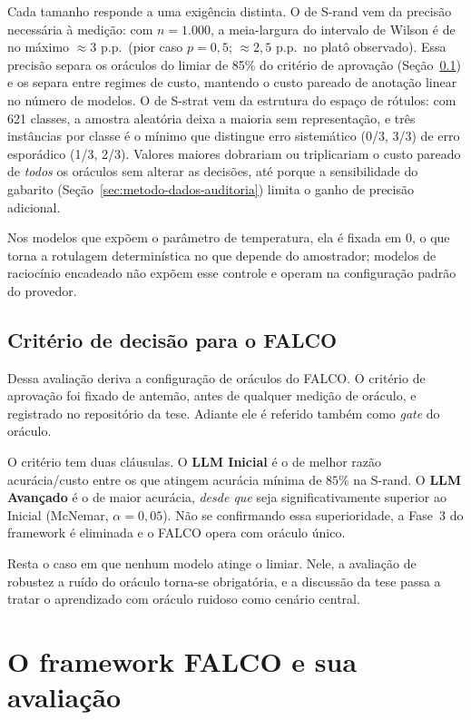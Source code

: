 Cada tamanho responde a uma exigência distinta. O de S-rand vem da precisão
necessária à medição: com $n=1.000$, a meia-largura do intervalo de Wilson é de
no máximo $\approx 3$ p.p.\ (pior caso $p=0{,}5$; $\approx 2{,}5$ p.p.\ no
platô observado). Essa precisão separa os oráculos do limiar de 85\% do
critério de aprovação (Seção~\ref{sec:metodo-oraculo-decisao}) e os separa
entre regimes de custo, mantendo o custo pareado de anotação linear no número
de modelos. O de S-strat vem da estrutura do espaço de rótulos: com 621
classes, a amostra aleatória deixa a maioria sem representação, e três
instâncias por classe é o mínimo que distingue erro sistemático (0/3, 3/3) de
erro esporádico (1/3, 2/3). Valores maiores dobrariam ou triplicariam o custo
pareado de \emph{todos} os oráculos sem alterar as decisões, até porque a
sensibilidade do gabarito (Seção~\ref{sec:metodo-dados-auditoria}) limita o
ganho de precisão adicional.

Nos modelos que expõem o parâmetro de temperatura, ela é fixada em 0, o que
torna a rotulagem determinística no que depende do amostrador; modelos de
raciocínio encadeado não expõem esse controle e operam na configuração padrão
do provedor.

\subsection{Critério de decisão para o FALCO}
\label{sec:metodo-oraculo-decisao}

Dessa avaliação deriva a configuração de oráculos do FALCO. O critério de
aprovação foi fixado de antemão, antes de qualquer medição de oráculo, e
registrado no repositório da tese. Adiante ele é referido também como
\emph{gate} do oráculo.

O critério tem duas cláusulas. O \textbf{LLM Inicial} é o de melhor razão
acurácia/custo entre os que atingem acurácia mínima de $85\%$ na S-rand. O
\textbf{LLM Avançado} é o de maior acurácia, \emph{desde que} seja
significativamente superior ao Inicial (McNemar, $\alpha=0{,}05$). Não se
confirmando essa superioridade, a Fase~3 do framework é eliminada e o FALCO
opera com oráculo único.

Resta o caso em que nenhum modelo atinge o limiar. Nele, a avaliação de
robustez a ruído do oráculo torna-se obrigatória, e a discussão da tese passa a
tratar o aprendizado com oráculo ruidoso como cenário central.

\section{O framework FALCO e sua avaliação}
\label{sec:metodo-falco}

